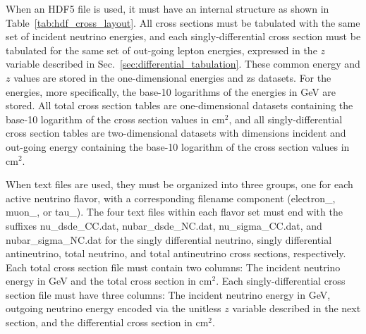 \documentclass[3p,12pt]{elsarticle}
\newcommand{\ttf}{\ttfamily}
\begin{document}
When an {\ttf HDF5} file is used, it must have an internal structure as shown 
in Table~\ref{tab:hdf_cross_layout}. All cross sections must be tabulated with the same set of incident neutrino energies, and each singly-differential cross section must be tabulated for the same set of out-going lepton energies, expressed in the $z$ variable described in Sec.~\ref{sec:differential_tabulation}. 
These common energy and $z$ values are stored in the one-dimensional {\ttf energies} and {\ttf zs} datasets. 
For the energies, more specifically, the base-10 logarithms of the energies in GeV are stored. 
All total cross section tables are one-dimensional datasets containing the base-10 logarithm of the cross section values in cm$^2$, and all singly-differential cross section tables are two-dimensional datasets with dimensions incident and out-going energy containing the base-10 logarithm of the cross section values in cm$^2$. 

When text files are used, they must be organized into three groups, 
one for each active neutrino flavor, with a corresponding 
filename component ({\ttf electron\_}, {\ttf muon\_}, or {\ttf tau\_}). 
The four text files within each flavor set must end with the suffixes
{\ttf nu\_dsde\_CC.dat}, {\ttf nubar\_dsde\_NC.dat}, {\ttf nu\_sigma\_CC.dat}, and
{\ttf nubar\_sigma\_NC.dat} for the singly differential neutrino, singly differential 
antineutrino, total neutrino, and total antineutrino cross sections, respectively. 
Each total cross section file must contain two columns: 
The incident neutrino energy in GeV and the total cross section in cm$^2$. 
Each singly-differential cross section file must have three columns:
The incident neutrino energy in GeV, 
outgoing neutrino energy encoded via the unitless $z$ variable described in the next section, 
and the differential cross section in cm$^2$. 
\end{document}
